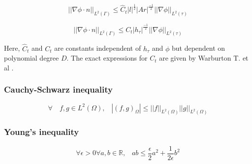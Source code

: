 \documentclass[a4paper,openany]{book}
\begin{document}
\begin{appendices}
\begin{equation}
||\nabla \phi \cdot n||_{L^2(\Gamma)} \leq \hat{C}_t |l|^{\frac{1}{2}} |Ar|^{\frac{-1}{2}} ||\nabla \phi||_{L^2(\tau)}
\end{equation}

\begin{equation}
||\nabla \phi \cdot n||_{L^2(\Gamma)} \leq {C}_t |h_\tau|^{\frac{-1}{2}} ||\nabla \phi||_{L^2(\tau)}
\end{equation}

Here, $\hat{C}_t$ and ${C}_t$ are constants independent of $h_\tau$ and $\phi$ but dependent on polynomial degree $D$. The exact expressions for $C_t$ are given by Warburton T. et al \cite{warburton}.

\subsubsection{Cauchy-Schwarz inequality} 
\begin{equation}
\forall \quad f,g \in L^2(\Omega) \textrm{,} \quad |(f,g)_{\Omega}| \leq ||f||_{L^2(\Omega)} ||g||_{L^2(\Omega)}
\end{equation}

\subsubsection{Young's inequality} 
\begin{equation}
\forall \epsilon > 0 \forall a,b \in \mathbb{R} \textrm{,} \quad ab \leq \frac{\epsilon}{2}a^2 + \frac{1}{2 \epsilon}b^2
\end{equation}

\end{appendices}
\end{document}
